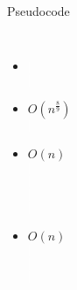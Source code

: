 \documentclass[18pt]{beamer}
\begin{document}
\begin{frame}{Pseudocode}
\begin{columns}
		\begin{itemize}\itemsep0pt
			\item[] \textcolor{white}{$|$}\\ \textcolor{white}{$|$}\\
			\vspace{5pt}
			\item[]$O(n^{\frac{8}{9}})$\\\textcolor{white}{$|$} \\ 					
			\item[]$O(n)$\\\textcolor{white}{$|$} \\\textcolor{white}{$|$} \\ \textcolor{white}{$|$}\\ \textcolor{white}{$|$}\\
			\item[]$O(n)$\\\textcolor{white}{$|$} \\\textcolor{white}{$|$} \\ \textcolor{white}{$|$}\\
		\end{itemize}
\end{columns}
\end{frame}
\end{document}
